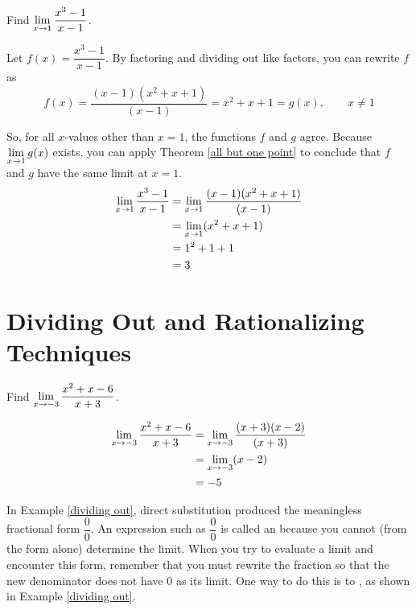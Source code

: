 \begin{example}
    Find $\displaystyle\lim\limits_{x\to 1}\dfrac{x^3-1}{x-1}$. \cite{ci}
    \begin{solution}
        Let $f(x)=\dfrac{x^3-1}{x-1}$. By factoring and dividing out like factors, you can rewrite $f$ as
        $$f(x)=\dfrac{(x-1)(x^2+x+1)}{(x-1)}=x^2+x+1=g(x),\qquad x\neq 1$$

        So, for all $x$-values other than $x=1$, the functions $f$ and $g$ agree. Because $\displaystyle\lim\limits_{x\to 1}g(x)$ exists, you can apply Theorem \ref{all but one point} to conclude that $f$ and $g$ have the same limit at $x=1$.
        \begin{align*}
            \displaystyle\lim\limits_{x\to 1}\dfrac{x^3-1}{x-1}
            &=\displaystyle\lim\limits_{x\to 1}\dfrac{(x-1)(x^2+x+1)}{(x-1)}\\
            &=\displaystyle\lim\limits_{x\to 1}(x^2+x+1)\\
            &=1^2+1+1\\
            &=3
        \end{align*}
    \end{solution}
\end{example}

\section{Dividing Out and Rationalizing Techniques}

\begin{example}
    Find $\displaystyle\lim\limits_{x\to -3}\dfrac{x^2+x-6}{x+3}$. \cite{ci}
    \begin{solution}
        \begin{align*}
            \displaystyle\lim\limits_{x\to -3}\dfrac{x^2+x-6}{x+3}
            &=\displaystyle\lim\limits_{x\to -3}\dfrac{(x+3)(x-2)}{(x+3)}\\
            &=\displaystyle\lim\limits_{x\to -3}(x-2)\\
            &=-5
        \end{align*}
    \end{solution}
    \label{dividing out}
\end{example}
In Example \ref{dividing out}, direct substitution produced the meaningless fractional form $\dfrac{0}{0}$. An expression such as $\dfrac{0}{0}$ is called an  because you cannot (from the form alone) determine the limit. When you try to evaluate a limit and encounter this form, remember that you must rewrite the fraction so that the new denominator does not have 0 as its limit. One way to do this is to , as shown in Example \ref{dividing out}.

